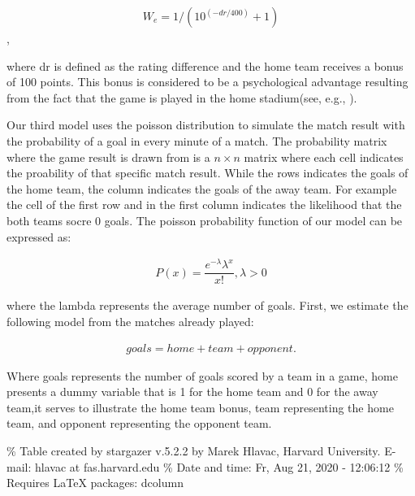 \documentclass[12pt,a4paper]{article}
\begin{document}
\begin{align}
W_e = 1/(10^{(-dr/400)}+1)
\end{align},

where dr is defined as the rating difference and the home team receives
a bonus of 100 points. This bonus is considered to be a psychological
advantage resulting from the fact that the game is played in the home
stadium(see, e.g., \textcite{Pollard2008}).

Our third model uses the poisson distribution to simulate the match
result with the probability of a goal in every minute of a match. The
probability matrix where the game result is drawn from is a
\(n \times n\) matrix where each cell indicates the proability of that
specific match result. While the rows indicates the goals of the home
team, the column indicates the goals of the away team. For example the
cell of the first row and in the first column indicates the likelihood
that the both teams socre \(0\) goals. The poisson probability function
of our model can be expressed as:

\begin{align}
P(x) = \dfrac{e^{-\lambda}\lambda^x}{x!}, \lambda > 0
\end{align}

where the lambda represents the average number of goals. First, we
estimate the following model from the matches already played:

\begin{align}
goals = home + team + opponent . 
\end{align}

Where goals represents the number of goals scored by a team in a game,
home presents a dummy variable that is 1 for the home team and 0 for the
away team,it serves to illustrate the home team bonus, team representing
the home team, and opponent representing the opponent team.

\% Table created by stargazer v.5.2.2 by Marek Hlavac, Harvard
University. E-mail: hlavac at fas.harvard.edu \% Date and time: Fr, Aug
21, 2020 - 12:06:12 \% Requires LaTeX packages: dcolumn
\end{document}
